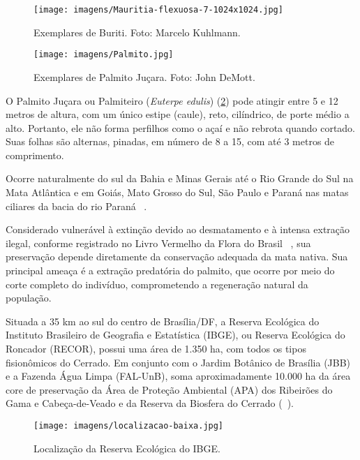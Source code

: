 \begin{figure}
    \centering
    \texttt{[image: imagens/Mauritia-flexuosa-7-1024x1024.jpg]}
    \caption{Exemplares de Buriti. Foto: Marcelo Kuhlmann.}
    \label{fig:buriti}
\end{figure}

\begin{figure}
    \centering
    \texttt{[image: imagens/Palmito.jpg]}
    \caption{Exemplares de Palmito Juçara. Foto: John DeMott.}
    \label{fig:palmito}
\end{figure}

O Palmito Juçara ou Palmiteiro (\textit{Euterpe edulis}) (\ref{fig:palmito}) pode atingir entre 5 e 12 metros de altura, com um único estipe (caule), reto, cilíndrico, de porte médio a alto. Portanto, ele não forma perfilhos como o açaí e não rebrota quando cortado. Suas folhas são alternas, pinadas, em número de 8 a 15, com até 3 metros de comprimento. 

Ocorre naturalmente do sul da Bahia e Minas Gerais até o Rio Grande do Sul na Mata Atlântica e em Goiás, Mato Grosso do Sul, São Paulo e Paraná nas matas ciliares da bacia do rio Paraná ~\cite{palmiteiro}.

Considerado vulnerável à extinção devido ao desmatamento e à intensa extração ilegal, conforme registrado no Livro Vermelho da Flora do Brasil ~\cite{livrovermelho}, sua preservação depende diretamente da conservação adequada da mata nativa. Sua principal ameaça é a extração predatória do palmito, que ocorre por meio do corte completo do indivíduo, comprometendo a regeneração natural da população.

Situada a 35 km ao sul do centro de Brasília/DF, a Reserva Ecológica do Instituto Brasileiro de Geografia e Estatística (IBGE), ou Reserva Ecológica do Roncador (RECOR), possui uma área de 1.350 ha, com todos os tipos fisionômicos do Cerrado. Em conjunto com o Jardim Botânico de Brasília (JBB) e a Fazenda Água Limpa (FAL-UnB), soma aproximadamente 10.000 ha da área core de preservação da Área de Proteção Ambiental (APA) dos Ribeirões do Gama e Cabeça-de-Veado e da Reserva da Biosfera do Cerrado (~\cite{unesco2002vegetaccao}).


\begin{figure}[H]
    \centering
    \texttt{[image: imagens/localizacao-baixa.jpg]}
    \caption{Localização da Reserva Ecológica do IBGE.}
    \label{fig:loc.ibge}
\end{figure}

